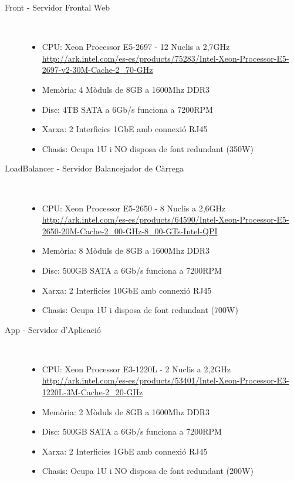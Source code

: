 \begin{description}
    \item[Front - Servidor Frontal Web] \hfill \\
        \vspace{-5mm}
        \begin{itemize}[leftmargin=*]
            \item CPU: Xeon Processor E5-2697 - 12 Nuclis a 2,7GHz
            \\\url{http://ark.intel.com/es-es/products/75283/Intel-Xeon-Processor-E5-2697-v2-30M-Cache-2\_70-GHz}
            \item Memòria: 4 Mòduls de 8GB a 1600Mhz DDR3
            \item Disc: 4TB SATA a 6Gb/s funciona a 7200RPM
            \item Xarxa: 2 Interficies 1GbE amb connexió RJ45
            \item Chasis: Ocupa 1U i NO disposa de font redundant (350W)
        \end{itemize}
    
    \item[LoadBalancer - Servidor Balancejador de Càrrega] \hfill \\
        \vspace{-5mm}
        \begin{itemize}[leftmargin=*]
            \item CPU: Xeon Processor E5-2650 - 8 Nuclis a 2,6GHz 
            \\\url{http://ark.intel.com/es-es/products/64590/Intel-Xeon-Processor-E5-2650-20M-Cache-2\_00-GHz-8\_00-GTs-Intel-QPI}
            \item Memòria: 8 Mòduls de 8GB a 1600Mhz DDR3
            \item Disc: 500GB SATA a 6Gb/s funciona a 7200RPM
            \item Xarxa: 2 Interficies 10GbE amb connexió RJ45
            \item Chasis: Ocupa 1U i disposa de font redundant (700W)
        \end{itemize}
        
    \item[App - Servidor d'Aplicació] \hfill \\
        \vspace{-5mm}
        \begin{itemize}[leftmargin=*]
            \item CPU: Xeon Processor E3-1220L - 2 Nuclis a 2,2GHz 
            \\\url{http://ark.intel.com/es-es/products/53401/Intel-Xeon-Processor-E3-1220L-3M-Cache-2\_20-GHz}
            \item Memòria: 2 Mòduls de 8GB a 1600Mhz DDR3
            \item Disc: 500GB SATA a 6Gb/s funciona a 7200RPM
            \item Xarxa: 2 Interficies 1GbE amb connexió RJ45
            \item Chasis: Ocupa 1U i NO disposa de font redundant (200W)
        \end{itemize}
        

\end{description}
